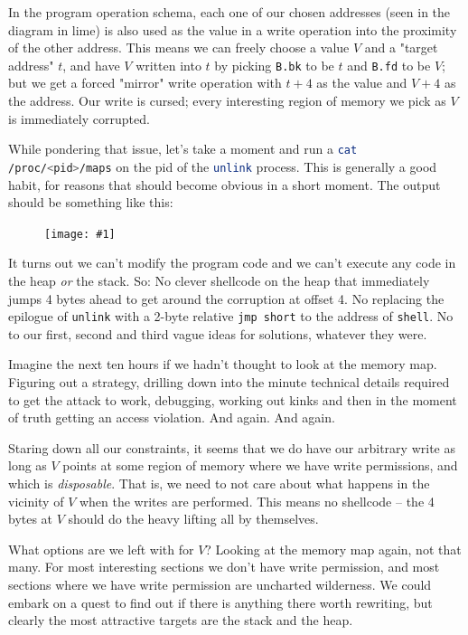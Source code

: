 \documentclass{article}
\newcommand{\displayimage}[1] {
\begin{figure}[H]
    \centering
    \texttt{[image: \#1]} 
\end{figure}
}
\newcommand{\xcode}[2]{\colorbox{ubuntuback}{\lstinline[language=#1]|#2|}}
\newcommand{\asm}[1]{\xcode{{[x86masm]assembler}}{#1}}
\newcommand{\code}[1]{\colorbox{ubuntuback}{\texttt{#1}}}
\begin{document}
In the program operation schema, each one of our chosen addresses (seen in the diagram in lime) is also used as the value in a write operation into the proximity of the other address. This means we can freely choose a value $V$ and a "target address" $t$, and have $V$ written into $t$ by picking \code{B.bk} to be $t$ and \code{B.fd} to be $V$; but we get a forced "mirror" write operation with $t+4$ as the value and $V+4$ as the address. Our write is cursed; every interesting region of memory we pick as $V$ is immediately corrupted.

While pondering that issue, let's take a moment and run a \xcode{bash}{cat /proc/<pid>/maps} on the pid of the \xcode{bash}{unlink} process. This is generally a good habit, for reasons that should become obvious in a short moment. The output should be something like this:

\displayimage{../18_unlink/memory_map.png}

It turns out we can't modify the program code and we can't execute any code in the heap \textit{or} the stack. So: No clever shellcode on the heap that immediately jumps 4 bytes ahead to get around the corruption at offset 4. No replacing the epilogue of \xcode{C}{unlink} with a 2-byte relative \asm{jmp short} to the address of \xcode{C}{shell}. No to our first, second and third vague ideas for solutions, whatever they were.

Imagine the next ten hours if we hadn't thought to look at the memory map. Figuring out a strategy, drilling down into the minute technical details required to get the attack to work, debugging, working out kinks and then in the moment of truth getting an access violation. And again. And again.

Staring down all our constraints, it seems that we do have our arbitrary write as long as $V$ points at some region of memory where we have write permissions, and which is \textit{disposable}. That is, we need to not care about what happens in the vicinity of $V$ when the writes are performed. This means no shellcode -- the 4 bytes at $V$ should do the heavy lifting all by themselves. 

What options are we left with for $V$? Looking at the memory map again, not that many. For most interesting sections we don't have write permission, and most sections where we have write permission are uncharted wilderness. We could embark on a quest to find out if there is anything there worth rewriting, but clearly the most attractive targets are the stack and the heap.
\end{document}

